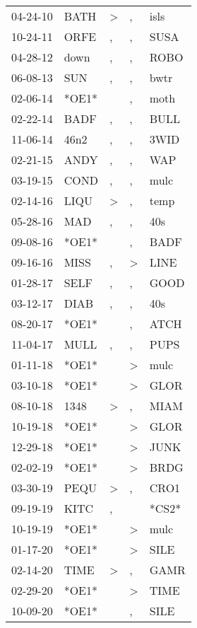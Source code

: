 \begin{supertabular}{lllll}
 04-24-10 &   BATH &  \textgreater &             , &   isls \\
 10-24-11 &   ORFE &             , &             , &   SUSA \\
 04-28-12 &   down &             , &             , &   ROBO \\
 06-08-13 &    SUN &             , &             , &   bwtr \\
 02-06-14 &  *OE1* &               &             , &   moth \\
 02-22-14 &   BADF &             , &             , &   BULL \\
 11-06-14 &   46n2 &             , &             , &   3WID \\
 02-21-15 &   ANDY &             , &             , &    WAP \\
 03-19-15 &   COND &             , &             , &   mulc \\
 02-14-16 &   LIQU &  \textgreater &             , &   temp \\
 05-28-16 &    MAD &             , &             , &    40s \\
 09-08-16 &  *OE1* &               &             , &   BADF \\
 09-16-16 &   MISS &             , &  \textgreater &   LINE \\
 01-28-17 &   SELF &             , &             , &   GOOD \\
 03-12-17 &   DIAB &             , &             , &    40s \\
 08-20-17 &  *OE1* &               &             , &   ATCH \\
 11-04-17 &   MULL &             , &             , &   PUPS \\
 01-11-18 &  *OE1* &               &  \textgreater &   mulc \\
 03-10-18 &  *OE1* &               &  \textgreater &   GLOR \\
 08-10-18 &   1348 &  \textgreater &             , &   MIAM \\
 10-19-18 &  *OE1* &               &  \textgreater &   GLOR \\
 12-29-18 &  *OE1* &               &  \textgreater &   JUNK \\
 02-02-19 &  *OE1* &               &  \textgreater &   BRDG \\
 03-30-19 &   PEQU &  \textgreater &             , &   CRO1 \\
 09-19-19 &   KITC &             , &               &  *CS2* \\
 10-19-19 &  *OE1* &               &  \textgreater &   mulc \\
 01-17-20 &  *OE1* &               &  \textgreater &   SILE \\
 02-14-20 &   TIME &  \textgreater &             , &   GAMR \\
 02-29-20 &  *OE1* &               &  \textgreater &   TIME \\
 10-09-20 &  *OE1* &               &             , &   SILE \\
\end{supertabular}

